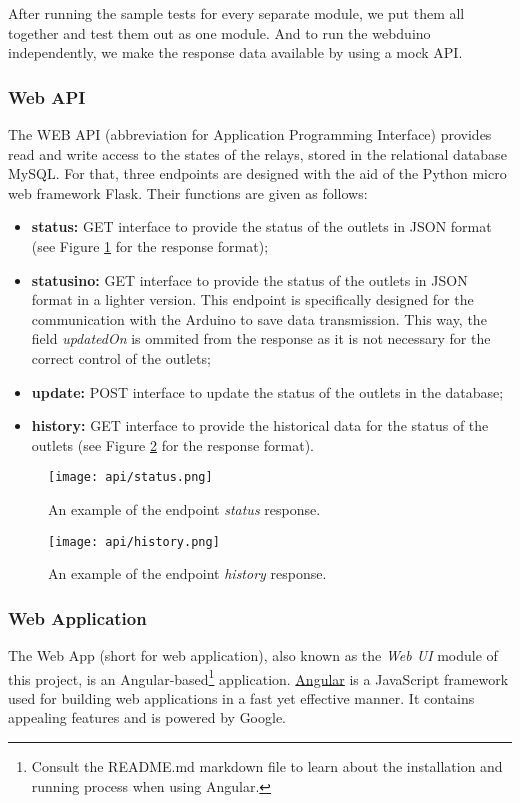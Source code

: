 After running the sample tests for every separate module, we put them all together and test them out as one module. And to run the webduino independently, we make the response data available by using a mock API.

\subsubsection{Web API}

The WEB API (abbreviation for Application Programming Interface) provides read
and write access to the states of the relays, stored in the relational
database MySQL. For that, three endpoints are designed with the aid of the
Python micro web framework Flask. Their functions are given as follows:

\begin{itemize}
    \item \textbf{status:} GET interface to provide the status of the outlets in
    JSON format (see Figure \ref{fig:api-status} for the response format);
    \item \textbf{statusino:} GET interface to provide the status of the outlets
    in JSON format in a lighter version. This endpoint is specifically designed
    for the communication with the Arduino to save data transmission.
    This way, the field \textit{updatedOn} is ommited from the response as it is
    not necessary for the correct control of the outlets;
    \item \textbf{update:} POST interface to update the status of the outlets in
    the database;
    \item \textbf{history:} GET interface to provide the historical data for the
    status of the outlets (see Figure \ref{fig:api-history} for the response format).
\end{itemize}

\begin{figure}[h!]
    \centering
    \texttt{[image: api/status.png]}
    \caption{An example of the endpoint \textit{status} response.}
    \label{fig:api-status}
\end{figure}

\begin{figure}[h!]
    \centering
    \texttt{[image: api/history.png]}
    \caption{An example of the endpoint \textit{history} response.}
    \label{fig:api-history}
\end{figure}

\subsubsection{Web Application}
The Web App (short for web application), also known as the \emph{Web UI} module of this project, is an Angular-based\footnote{Consult the README.md markdown file to learn about the installation and running process when using Angular.} application. \href{https://angular.io}{Angular} is a JavaScript framework used for building web applications in a fast yet effective manner. It contains appealing features and is powered by Google.

